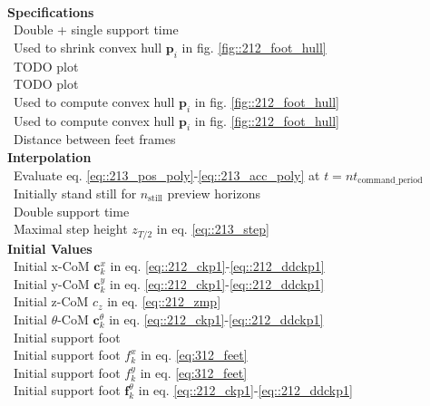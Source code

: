 \\
\begin{minipage}[t]{1.\textwidth}
	\begin{minipage}{0.5\textwidth}
		\scriptsize{
			\hfill \textbf{Specifications}\\
			\mbox{}~\hfill Double + single support time\\
			\mbox{}~\hfill Used to shrink convex hull $\bm{p}_i$ in fig.  \ref{fig::212_foot_hull}\\
			\mbox{}~\hfill TODO plot\\
			\mbox{}~\hfill TODO plot\\
			\mbox{}~\hfill Used to compute convex hull $\bm{p}_i$ in fig.  \ref{fig::212_foot_hull}\\
			\mbox{}~\hfill Used to compute convex hull $\bm{p}_i$ in fig.  \ref{fig::212_foot_hull}\\
			\mbox{}~\hfill Distance between feet frames\\
			
			\hfill \textbf{Interpolation}\\
			\mbox{}~\hfill Evaluate eq. \ref{eq::213_pos_poly}-\ref{eq::213_acc_poly} at $t=nt_\text{command\_period}$\\
			\mbox{}~\hfill Initially stand still for $n_\text{still}$ preview horizons\\
			\mbox{}~\hfill Double support time\\
			\mbox{}~\hfill Maximal step height $z_{T/2}$ in eq. \ref{eq::213_step}\\
			
			\hfill \textbf{Initial Values}\\
			\mbox{}~\hfill Initial x-CoM $\bm{c}_k^x$ in eq. \ref{eq::212_ckp1}-\ref{eq::212_ddckp1}\\
			\mbox{}~\hfill Initial y-CoM $\bm{c}_k^y$ in eq. \ref{eq::212_ckp1}-\ref{eq::212_ddckp1}\\
			\mbox{}~\hfill Initial z-CoM $c_z$ in eq. \ref{eq::212_zmp}\\
			\mbox{}~\hfill Initial $\theta$-CoM $\bm{c}_k^\theta$ in eq. \ref{eq::212_ckp1}-\ref{eq::212_ddckp1}\\
			\mbox{}~\hfill Initial support foot\\
			\mbox{}~\hfill Initial support foot $f_k^x$ in eq. \ref{eq:312_feet}\\
			\mbox{}~\hfill Initial support foot $f_k^y$ in eq. \ref{eq:312_feet}\\
			\mbox{}~\hfill Initial support foot $\bm{f}_k^\theta$ in eq. \ref{eq::212_ckp1}-\ref{eq::212_ddckp1}\\
			
}
\end{minipage}
\end{minipage}
